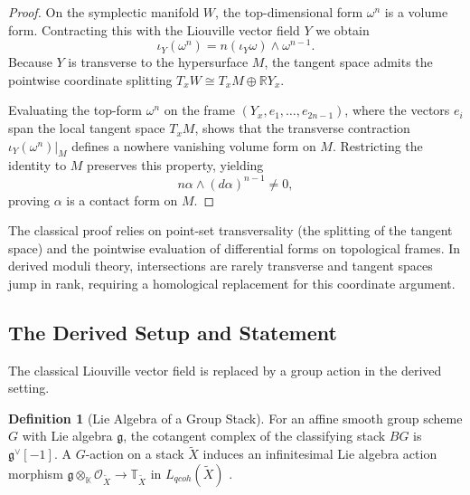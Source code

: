 \documentclass[reqno]{amsart}
\theoremstyle{definition}
\newtheorem{definition}[theorem]{Definition}
\theoremstyle{remark}
\newcommand{\TT}{\mathbb{T}}
\newcommand{\cO}{\mathcal{O}}
\newcommand{\K}{\mathbb{K}}
\begin{document}
{\begin{proof}
  On the symplectic manifold $W$, the top-dimensional form $\omega^n$
  is a volume form. Contracting this with the Liouville vector field $Y$ we obtain
  \begin{equation*}
    \iota_Y(\omega^n) = n (\iota_Y \omega) \wedge \omega^{n-1}.
  \end{equation*}
  Because $Y$ is transverse to the hypersurface $M$, the tangent
  space admits the pointwise coordinate splitting $T_x W \cong T_x M
  \oplus \mathbb{R}Y_x$.
  
  Evaluating the top-form $\omega^n$ on the frame $(Y_x, e_1, \dots,
  e_{2n-1})$, where the vectors $e_i$ span the local tangent space
  $T_x M$, shows that the transverse contraction
  $\iota_Y(\omega^n)|_M$ defines a nowhere vanishing volume form on
  $M$. Restricting the identity to $M$ preserves this
  property, yielding
  \begin{equation*}
    n \alpha \wedge (d\alpha)^{n-1} \neq 0,
  \end{equation*}
  proving $\alpha$
  is a contact form on $M$.
\end{proof}

The classical proof relies on point-set transversality
(the splitting of the tangent space) and the pointwise evaluation
of differential forms on topological frames. In derived moduli
theory, intersections are rarely transverse and tangent
spaces jump in rank, requiring a homological replacement for
this coordinate argument.
\subsection{The Derived Setup and Statement} \label{sec:setup}

The classical Liouville vector field is replaced by a group action in
the derived setting.

\begin{definition}[Lie Algebra of a Group Stack]
  For an affine smooth group scheme $G$ with Lie algebra
  $\mathfrak{g}$, the cotangent complex of the classifying stack $BG$
  is $\mathfrak{g}^\vee[-1]$. A $G$-action on a stack $\widetilde{X}$
  induces an infinitesimal Lie algebra action morphism
  $\mathfrak{g} \otimes_\K \cO_{\widetilde{X}} \to
  \TT_{\widetilde{X}}$ in $L_{qcoh}(\widetilde{X})$ \cite[Section 1.2]{PTVV}.
\end{definition}

}
\end{document}
